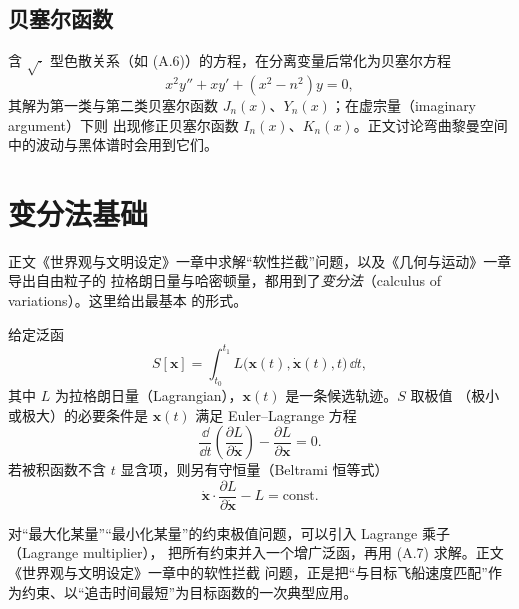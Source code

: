 \subsection{贝塞尔函数}

含 $\sqrt{\cdot}$ 型色散关系（如 (A.6)）的方程，在分离变量后常化为贝塞尔方程
\begin{equation}
x^{2}y''+xy'+(x^{2}-n^{2})y=0 ,
\end{equation}
其解为第一类与第二类贝塞尔函数 $J_n(x)$、$Y_n(x)$；在虚宗量（imaginary argument）下则
出现修正贝塞尔函数 $I_n(x)$、$K_n(x)$。正文讨论弯曲黎曼空间中的波动与黑体谱时会用到它们。

\section{变分法基础}

正文《世界观与文明设定》一章中求解“软性拦截”问题，以及《几何与运动》一章导出自由粒子的
拉格朗日量与哈密顿量，都用到了\emph{变分法}（calculus of variations）。这里给出最基本
的形式。

给定泛函
\begin{equation}
S[\mathbf{x}]=\int_{t_0}^{t_1} L\big(\mathbf{x}(t),\dot{\mathbf{x}}(t),t\big)\,\dd t ,
\end{equation}
其中 $L$ 为拉格朗日量（Lagrangian），$\mathbf{x}(t)$ 是一条候选轨迹。$S$ 取极值
（极小或极大）的必要条件是 $\mathbf{x}(t)$ 满足 Euler–Lagrange 方程
\begin{equation}
\frac{\dd}{\dd t}\left(\frac{\partial L}{\partial \dot{\mathbf{x}}}\right)
-\frac{\partial L}{\partial \mathbf{x}}=0 .
\tag{A.7}
\end{equation}
若被积函数不含 $t$ 显含项，则另有守恒量（Beltrami 恒等式）
\begin{equation}
\dot{\mathbf{x}}\cdot\frac{\partial L}{\partial\dot{\mathbf{x}}}-L=\text{const}.
\end{equation}

对“最大化某量”“最小化某量”的约束极值问题，可以引入 Lagrange 乘子（Lagrange multiplier），
把所有约束并入一个增广泛函，再用 (A.7) 求解。正文《世界观与文明设定》一章中的软性拦截
问题，正是把“与目标飞船速度匹配”作为约束、以“追击时间最短”为目标函数的一次典型应用。

